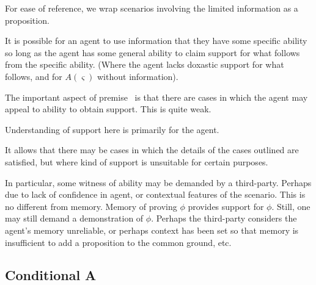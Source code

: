 \begin{note}
  For ease of reference, we wrap scenarios involving the limited information as a proposition.
  \begin{proposition}[\eA{}]\label{prem:ab}
    It is possible for an agent to use information that they have some specific ability so long as the agent has some general ability to claim support for what follows from the specific ability.
    (Where the agent lacks doxastic support for what follows, and for \(A(\varsigma)\) without information).
  \end{proposition}
\end{note}

\begin{note}
  The important aspect of premise~\eA{} is that there are cases in which the agent may appeal to ability to obtain support.
  This is quite weak.

  Understanding of support here is primarily for the agent.

  It allows that there may be cases in which the details of the cases outlined are satisfied, but where kind of support is unsuitable for certain purposes.

  In particular, some witness of ability may be demanded by a third-party.
  Perhaps due to lack of confidence in agent, or contextual features of the scenario.
  This is no different from memory.
  Memory of proving \(\phi\) provides support for \(\phi\).
  Still, one may still demand a demonstration of \(\phi\).
  Perhaps the third-party considers the agent's memory unreliable, or perhaps context has been set so that memory is insufficient to add a proposition to the common ground, etc.
\end{note}

\subsection{Conditional A}
\label{sec:first-conditional}

